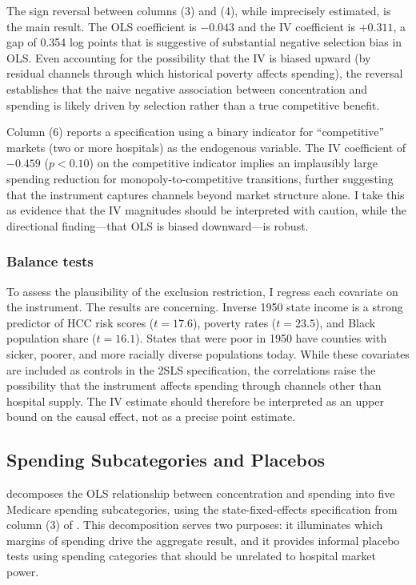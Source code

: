 \documentclass[12pt]{article}
\begin{document}
The sign reversal between columns (3) and (4), while imprecisely estimated, is the main result. The OLS coefficient is $-0.043$ and the IV coefficient is $+0.311$, a gap of 0.354 log points that is suggestive of substantial negative selection bias in OLS. Even accounting for the possibility that the IV is biased upward (by residual channels through which historical poverty affects spending), the reversal establishes that the naive negative association between concentration and spending is likely driven by selection rather than a true competitive benefit.

Column (6) reports a specification using a binary indicator for ``competitive'' markets (two or more hospitals) as the endogenous variable. The IV coefficient of $-0.459$ ($p < 0.10$) on the competitive indicator implies an implausibly large spending reduction for monopoly-to-competitive transitions, further suggesting that the instrument captures channels beyond market structure alone. I take this as evidence that the IV magnitudes should be interpreted with caution, while the directional finding---that OLS is biased downward---is robust.

\subsubsection*{Balance tests} To assess the plausibility of the exclusion restriction, I regress each covariate on the instrument. The results are concerning. Inverse 1950 state income is a strong predictor of HCC risk scores ($t = 17.6$), poverty rates ($t = 23.5$), and Black population share ($t = 16.1$). States that were poor in 1950 have counties with sicker, poorer, and more racially diverse populations today. While these covariates are included as controls in the 2SLS specification, the correlations raise the possibility that the instrument affects spending through channels other than hospital supply. The IV estimate should therefore be interpreted as an upper bound on the causal effect, not as a precise point estimate.



\subsection{Spending Subcategories and Placebos}

 decomposes the OLS relationship between concentration and spending into five Medicare spending subcategories, using the state-fixed-effects specification from column (3) of . This decomposition serves two purposes: it illuminates which margins of spending drive the aggregate result, and it provides informal placebo tests using spending categories that should be unrelated to hospital market power.
\end{document}
